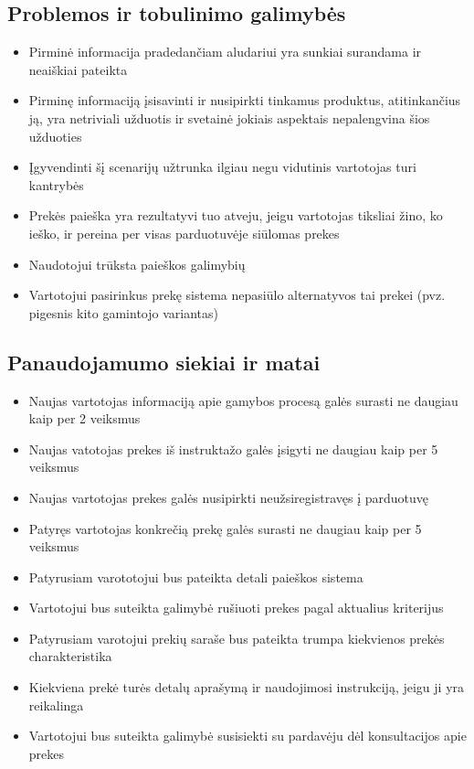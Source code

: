 \documentclass[oneside]{VUMIFPSkursinis}
\begin{document}
	\subsection{Problemos ir tobulinimo galimybės}
		\begin{itemize}
			\item{Pirminė informacija pradedančiam aludariui yra sunkiai surandama ir neaiškiai pateikta}
			\item{Pirminę informaciją įsisavinti ir nusipirkti tinkamus produktus, atitinkančius ją, yra netriviali užduotis ir svetainė jokiais aspektais nepalengvina šios užduoties}
			\item{Įgyvendinti šį scenarijų užtrunka ilgiau negu vidutinis vartotojas turi kantrybės}
			\item{Prekės paieška yra rezultatyvi tuo atveju, jeigu vartotojas tiksliai žino, ko ieško, ir pereina per visas parduotuvėje siūlomas prekes}
			\item{Naudotojui trūksta paieškos galimybių}
			\item{Vartotojui pasirinkus prekę sistema nepasiūlo alternatyvos tai prekei (pvz. pigesnis kito gamintojo variantas)}
		\end{itemize}
	\subsection{Panaudojamumo siekiai ir matai}
		\begin{itemize}
			\item{Naujas vartotojas informaciją apie gamybos procesą galės surasti ne daugiau kaip per 2 veiksmus}
			\item{Naujas vatotojas prekes iš instruktažo galės įsigyti ne daugiau kaip per 5 veiksmus}
			\item{Naujas vartotojas prekes galės nusipirkti neužsiregistravęs į parduotuvę}
			\item{Patyręs vartotojas konkrečią prekę galės surasti ne daugiau kaip per 5 veiksmus}
			\item{Patyrusiam varototojui bus pateikta detali paieškos sistema}
			\item{Vartotojui bus suteikta galimybė rušiuoti prekes pagal aktualius kriterijus}
			\item{Patyrusiam varotojui prekių saraše bus pateikta trumpa kiekvienos prekės charakteristika}
			\item{Kiekviena prekė turės detalų aprašymą ir naudojimosi instrukciją, jeigu ji yra reikalinga}
			\item{Vartotojui bus suteikta galimybė susisiekti su pardavėju dėl konsultacijos apie prekes}
		\end{itemize}
\end{document}
